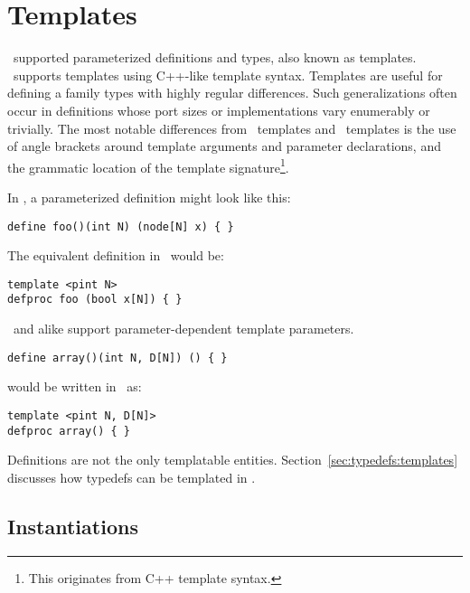 
\section{Templates}
\label{sec:templates}

\CAST\ supported parameterized definitions and types, also known as templates.
\hac\ supports templates using C++-like template syntax.  
Templates are useful for defining a family types with 
highly regular differences.  
Such generalizations often occur in definitions whose 
port sizes or implementations vary enumerably or trivially.  
The most notable differences from \CAST\ templates and \hac\ templates
is the use of angle brackets around template arguments 
and parameter declarations, and the grammatic location of the 
template signature\footnote{This originates from C++ template syntax.}.  

In \CAST, a parameterized definition might look like this:

\begin{verbatim}
define foo()(int N) (node[N] x) { }
\end{verbatim}

The equivalent definition in \hac\ would be:

\begin{verbatim}
template <pint N>
defproc foo (bool x[N]) { }
\end{verbatim}

\CAST\ and \hac alike support parameter-dependent template parameters.

\begin{verbatim}
define array()(int N, D[N]) () { }
\end{verbatim}

\noindent
would be written in \hac\ as:

\begin{verbatim}
template <pint N, D[N]>
defproc array() { }
\end{verbatim}

Definitions are not the only templatable entities.  
Section~\ref{sec:typedefs:templates} discusses how typedefs 
can be templated in \hac.  

\subsection{Instantiations}
\label{sec:templates:inst}

